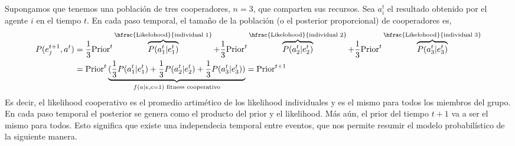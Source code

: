 \documentclass[a4paper,10pt]{article}
\begin{document}
Supongamos que tenemos una población de tres cooperadores, $n=3$, que comparten sus recursos.
Sea $a_i^t$ el resultado obtenido por el agente $i$ en el tiempo $t$.
En cada paso temporal, el tamaño de la población (o el posterior proporcional) de cooperadores es,
\begin{equation}
\begin{split}
P(e_j^{t+1}, a^t) &=\frac{1}{3} \text{Prior}^t  \overbrace{P(a_1^t|e_1^t)}^{\hfrac{\text{Likelohood}}{\text{individual 1}}} + \frac{1}{3} \text{Prior}^t  \overbrace{P(a_2^t|e_2^t)}^{\hfrac{\text{Likelohood}}{\text{individual 2}}}  + \frac{1}{3} \text{Prior}^t  \overbrace{P(a_3^t|e_3^t)}^{\hfrac{\text{Likelohood}}{\text{individual 3}}}  \\
&= \text{Prior}^t \underbrace{(\frac{1}{3} P(a_1^t|e_1^t) + \frac{1}{3} P(a_2^t|e_2^t) + \frac{1}{3} P(a_3^t|e_3^t))}_{f(a|e,c=1)\text{ fitness cooperativo}} = \text{Prior}^{t+1}
\end{split}
\end{equation}
%
Es decir, el likelihood cooperativo es el promedio artimético de los likelihood individuales y es el mismo para todos los miembros del grupo.
En cada paso temporal el posterior se genera como el producto del prior y el likelihood.
Más aún, el prior del tiempo $t+1$ va a ser el mismo para todos.
Esto significa que existe una independecia temporal entre eventos, que nos permite resumir el modelo probabilístico de la siguiente manera.
%     
%     
%     
%     
\end{document}
